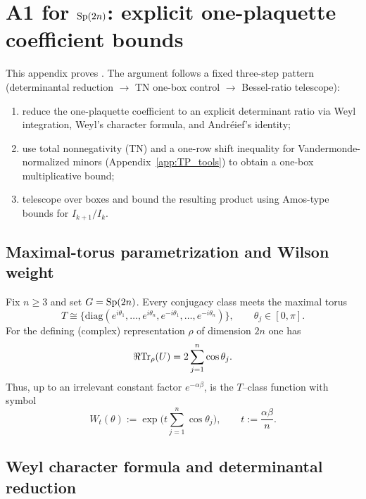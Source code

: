 \section{A1 for \texorpdfstring{$\mathrm{Sp}(2n)$}{Sp(2n)}: explicit one-plaquette coefficient bounds}
\label{app:A1_Sp}

This appendix proves .
The argument follows a fixed three-step pattern (determinantal reduction $\to$ TN one-box control $\to$ Bessel-ratio telescope):

\begin{enumerate}[label=(\arabic*)]
\item reduce the one-plaquette coefficient to an explicit determinant ratio via Weyl integration, Weyl's character formula,
      and Andr\'eief's identity;
\item use total nonnegativity (TN) and a one-row shift inequality for Vandermonde-normalized minors (Appendix~\ref{app:TP_tools})
      to obtain a one-box multiplicative bound;
\item telescope over boxes and bound the resulting product using Amos-type bounds for $I_{k+1}/I_k$.
\end{enumerate}

\subsection{Maximal-torus parametrization and Wilson weight}
\label{subsec:A1_Sp_setup}

Fix $n\ge 3$ and set $G=\mathrm{Sp}(2n)$.
Every conjugacy class meets the maximal torus
\begin{equation}
\label{eq:Sp_torus}
T\cong\{\mathrm{diag}(e^{i\theta_1},\dots,e^{i\theta_n},e^{-i\theta_1},\dots,e^{-i\theta_n})\},\qquad \theta_j\in[0,\pi].
\end{equation}
For the defining (complex) representation $\rho$ of dimension $2n$ one has
\begin{equation}
\label{eq:Sp_trace}
\Re\mathrm{Tr}_{\rho}(U)=2\sum_{j=1}^n \cos\theta_j.
\end{equation}
Thus, up to an irrelevant constant factor $e^{-\alpha\beta}$,
 is the $T$--class function with symbol
\begin{equation}
\label{eq:Sp_symbol}
W_t(\theta):=\exp\Big(t\sum_{j=1}^n \cos\theta_j\Big),\qquad t:=\frac{\alpha\beta}{n}.
\end{equation}

\subsection{Weyl character formula and determinantal reduction}
\label{subsec:A1_Sp_determinant}

